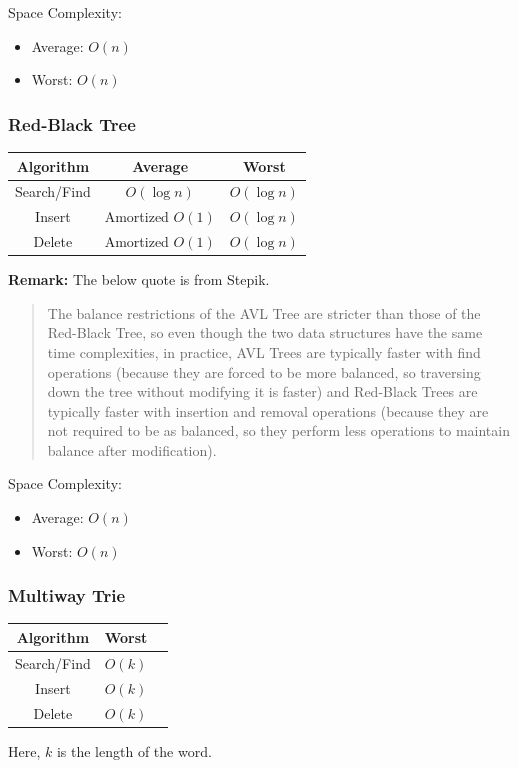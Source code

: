 \documentclass[letterpaper]{article}
\begin{document}
Space Complexity: 
\begin{itemize}
    \item Average: $O(n)$ 
    \item Worst: $O(n)$
\end{itemize}


\subsubsection{Red-Black Tree}
\begin{center}
    \begin{tabular}{|c|c|c|}
        \hline 
        \textbf{Algorithm} & \textbf{Average} & \textbf{Worst} \\ 
        \hline 
        Search/Find & $O(\log n)$ & $O(\log n)$ \\ 
        Insert & Amortized $O(1)$ & $O(\log n)$ \\ 
        Delete & Amortized $O(1)$ & $O(\log n)$ \\ 
        \hline 
    \end{tabular}
\end{center}
\textbf{Remark:} The below quote is from Stepik. 
\begin{quote}
    The balance restrictions of the AVL Tree are stricter than those of the Red-Black Tree, so even though the two data structures have the same time complexities, in practice, AVL Trees are typically faster with find operations (because they are forced to be more balanced, so traversing down the tree without modifying it is faster) and Red-Black Trees are typically faster with insertion and removal operations (because they are not required to be as balanced, so they perform less operations to maintain balance after modification).
\end{quote}

Space Complexity: 
\begin{itemize}
    \item Average: $O(n)$ 
    \item Worst: $O(n)$
\end{itemize}


\subsubsection{Multiway Trie}
\begin{center}
    \begin{tabular}{|c|c|c|}
        \hline 
        \textbf{Algorithm} & \textbf{Worst} \\ 
        \hline 
        Search/Find & $O(k)$ \\ 
        Insert & $O(k)$ \\ 
        Delete & $O(k)$ \\ 
        \hline 
    \end{tabular}
\end{center}
Here, $k$ is the length of the word. 
\end{document}
